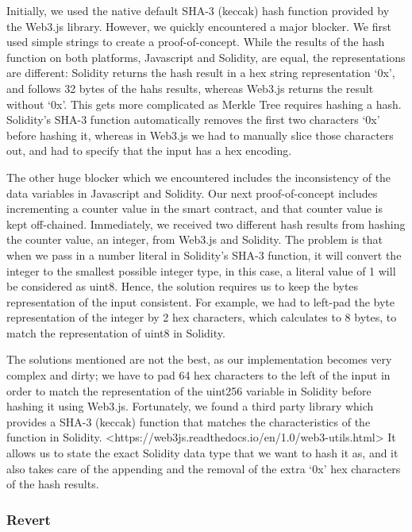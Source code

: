 Initially, we used the native default SHA-3 (keccak) hash function provided by the Web3.js library. However, we quickly encountered a major blocker. We first used simple strings to create a proof-of-concept. While the results of the hash function on both platforms, Javascript and Solidity, are equal, the representations are different: Solidity returns the hash result in a hex string representation ‘0x’, and follows 32 bytes of the hahs results, whereas Web3.js returns the result without ‘0x’. This gets more complicated as Merkle Tree requires hashing a hash. Solidity’s SHA-3 function automatically removes the first two characters ‘0x’ before hashing it, whereas in Web3.js we had to manually slice those characters out, and had to specify that the input has a hex encoding.

The other huge blocker which we encountered includes the inconsistency of the data variables in Javascript and Solidity. Our next proof-of-concept includes incrementing a counter value in the smart contract, and that counter value is kept off-chained. Immediately, we received two different hash results from hashing the counter value, an integer, from Web3.js and Solidity. The problem is that when we pass in a number literal in Solidity’s SHA-3 function, it will convert the integer to the smallest possible integer type, in this case, a literal value of 1 will be considered as uint8. Hence, the solution requires us to keep the bytes representation of the input consistent. For example, we had to left-pad the byte representation of the integer by 2 hex characters, which calculates to 8 bytes, to match the representation of uint8 in Solidity. 

The solutions mentioned are not the best, as our implementation becomes very complex and dirty; we have to pad 64 hex characters to the left of the input in order to match the representation of the uint256 variable in Solidity before hashing it using Web3.js. Fortunately, we found a third party library which provides a SHA-3 (keccak) function that matches the characteristics of the function in Solidity. <https://web3js.readthedocs.io/en/1.0/web3-utils.html> It allows us to state the exact Solidity data type that we want to hash it as, and it also takes care of the appending and the removal of the extra ‘0x’ hex characters of the hash results.

\subsubsection*{Revert}

